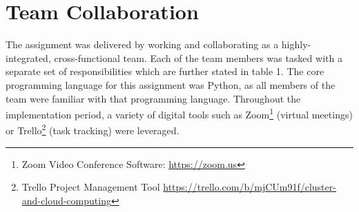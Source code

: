 \documentclass[11pt, oneside]{article}
\begin{document}
\section{Team Collaboration}
\label{sec:team_collaboration}
The assignment was delivered by working and collaborating as a highly-integrated, cross-functional team. Each of the team members was tasked with a separate set of responsibilities which are further stated in table 1. The core programming language for this assignment was Python, as all members of the team were familiar with that programming language. 
\newline
Throughout the implementation period, a variety of digital tools such as Zoom\footnote{Zoom Video Conference Software: \url{https://zoom.us}} (virtual meetings) or Trello\footnote{Trello Project Management Tool \url{https://trello.com/b/mjCUm91f/cluster-and-cloud-computing}} (task tracking) were leveraged. 
\end{document}
